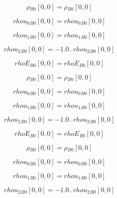 \documentclass{article}
\begin{document}
\begin{dmath}{\rho{_{B0}}}[{0,0}] = {\rho{_{B0}}}[{0,0}]\end{dmath}

\begin{dmath}{rhou_{0}{_{B0}}}[{0,0}] = {rhou_{0}{_{B0}}}[{0,0}]\end{dmath}

\begin{dmath}{rhou_{1}{_{B0}}}[{0,0}] = {rhou_{1}{_{B0}}}[{0,0}]\end{dmath}

\begin{dmath}{rhou_{2}{_{B0}}}[{0,0}] = - 1.0 \,.\, {rhou_{2}{_{B0}}}[{0,0}]\end{dmath}

\begin{dmath}{rhoE{_{B0}}}[{0,0}] = {rhoE{_{B0}}}[{0,0}]\end{dmath}

\begin{dmath}{\rho{_{B0}}}[{0,0}] = {\rho{_{B0}}}[{0,0}]\end{dmath}

\begin{dmath}{rhou_{0}{_{B0}}}[{0,0}] = {rhou_{0}{_{B0}}}[{0,0}]\end{dmath}

\begin{dmath}{rhou_{1}{_{B0}}}[{0,0}] = {rhou_{1}{_{B0}}}[{0,0}]\end{dmath}

\begin{dmath}{rhou_{2}{_{B0}}}[{0,0}] = - 1.0 \,.\, {rhou_{2}{_{B0}}}[{0,0}]\end{dmath}

\begin{dmath}{rhoE{_{B0}}}[{0,0}] = {rhoE{_{B0}}}[{0,0}]\end{dmath}

\begin{dmath}{\rho{_{B0}}}[{0,0}] = {\rho{_{B0}}}[{0,0}]\end{dmath}

\begin{dmath}{rhou_{0}{_{B0}}}[{0,0}] = {rhou_{0}{_{B0}}}[{0,0}]\end{dmath}

\begin{dmath}{rhou_{1}{_{B0}}}[{0,0}] = {rhou_{1}{_{B0}}}[{0,0}]\end{dmath}

\begin{dmath}{rhou_{2}{_{B0}}}[{0,0}] = - 1.0 \,.\, {rhou_{2}{_{B0}}}[{0,0}]\end{dmath}
\end{document}
